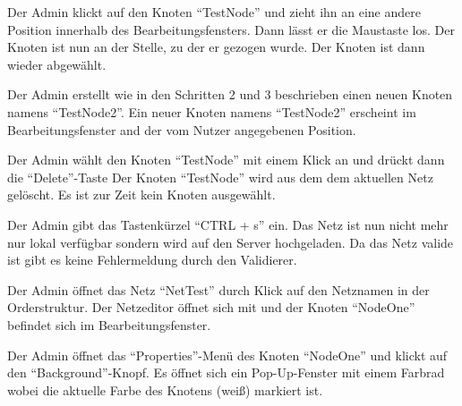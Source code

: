 \documentclass[parskip=full,11pt,twoside]{scrartcl}
\begin{document}
{Der Admin klickt auf den Knoten \enquote{TestNode} und zieht ihn an eine andere Position innerhalb des Bearbeitungsfensters. Dann lässt er die Maustaste los.}
{Der Knoten ist nun an der Stelle, zu der er gezogen wurde. Der Knoten ist dann wieder abgewählt.}

{Der Admin erstellt wie in den Schritten 2 und 3 beschrieben einen neuen Knoten namens \enquote{TestNode2}.}
{Ein neuer Knoten namens \enquote{TestNode2} erscheint im Bearbeitungsfenster and der vom Nutzer angegebenen Position.}

{Der Admin wählt den Knoten \enquote{TestNode} mit einem Klick an und drückt dann die \enquote{Delete}-Taste}
{Der Knoten \enquote{TestNode} wird aus dem dem aktuellen Netz gelöscht. Es ist zur Zeit kein Knoten ausgewählt.}

{Der Admin gibt das Tastenkürzel \enquote{CTRL + s} ein.}
{Das Netz ist nun nicht mehr nur lokal verfügbar sondern wird auf den Server hochgeladen. Da das Netz valide ist gibt es keine Fehlermeldung durch den Validierer.}


{Der Admin öffnet das Netz \enquote{NetTest} durch Klick auf den Netznamen in der Orderstruktur.}
{Der Netzeditor öffnet sich mit und der Knoten \enquote{NodeOne} befindet sich im Bearbeitungsfenster.}

{Der Admin öffnet das \enquote{Properties}-Menü des Knoten \enquote{NodeOne} und klickt auf den \enquote{Background}-Knopf.}
{Es öffnet sich ein Pop-Up-Fenster mit einem Farbrad wobei die aktuelle Farbe des Knotens (weiß) markiert ist.}
\end{document}

